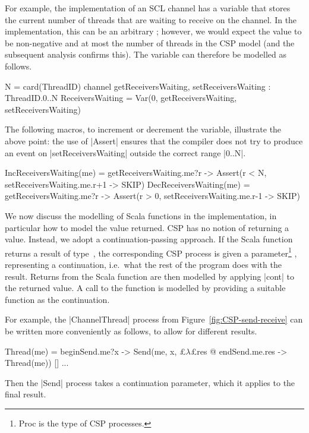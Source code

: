 For example, the implementation of an SCL channel has a variable
 that stores the current number of threads that are
waiting to receive on the channel.  In the implementation, this can be an
arbitrary ; however, we would expect the value to be non-negative
and at most the number of threads in the CSP model (and the subsequent
analysis confirms this).  The variable can therefore be modelled as follows.
%
\begin{cspm}
N = card(ThreadID)
channel getReceiversWaiting, setReceiversWaiting : ThreadID.{0..N}
ReceiversWaiting = Var(0, getReceiversWaiting, setReceiversWaiting)
\end{cspm}
%
The following macros, to increment or decrement the 
variable, illustrate the above point: the use of |Assert| ensures that the
compiler does not try to produce an event on |setReceiversWaiting| outside the
correct range |{0..N}|.
%
\begin{cspm}
IncReceiversWaiting(me) =
  getReceiversWaiting.me?r -> Assert(r < N, setReceiversWaiting.me.r+1 -> SKIP)
DecReceiversWaiting(me) = 
  getReceiversWaiting.me?r -> Assert(r > 0, setReceiversWaiting.me.r-1 -> SKIP)
\end{cspm}

We now discuss the modelling of Scala functions in the implementation, in
particular how to model the value returned.  CSP has no notion of returning a
value.  Instead, we adopt a continuation-passing approach.  If the Scala
function returns a result of type~, the corresponding CSP process is
given a parameter\footnote{{\cspmstyle Proc} is the type of CSP processes.}
, representing a continuation, i.e.~what the rest of
the program does with the result.  Returns from the Scala function are then
modelled by applying |cont| to the returned value.  A call to the function is
modelled by providing a suitable function as the continuation.

For example, the |ChannelThread| process from
Figure~\ref{fig:CSP-send-receive} can be written more conveniently as follows,
to allow for different results.
\begin{cspm}
Thread(me) = beginSend.me?x -> Send(me, x, £$\lambda$£res @ endSend.me.res -> Thread(me))  [] ...
\end{cspm}
%
Then the |Send| process takes a continuation parameter, which it applies to
the final result.

